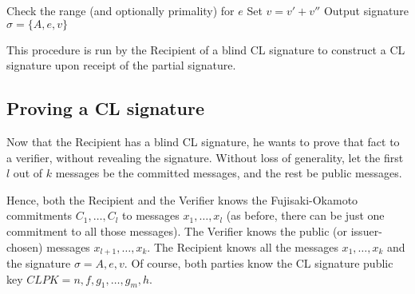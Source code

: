 \begin{algorithm}[H]\label{constructCL}
\dontprintsemicolon

\BlankLine

 \;
\Indp
  Check the range (and optionally primality) for $e$ \;
  Set $v = v' + v''$ \;
  Output signature $\sigma = \{A,e,v\}$ \;
\Indm

\caption{This procedure is run by the Recipient of a blind CL signature to construct a CL signature upon receipt of the partial signature.}
\end{algorithm}





\subsection{Proving a CL signature}

Now that the Recipient has a blind CL signature, he wants to prove that fact to a verifier, without revealing the signature. Without loss of generality, let the first $l$ out of $k$ messages be the committed messages, and the rest be public messages.

Hence, both the Recipient and the Verifier knows the Fujisaki-Okamoto commitments $C_1,\ldots,C_l$ to messages $x_1,\ldots,x_l$ (as before, there can be just one commitment to all those messages). The Verifier knows the public (or issuer-chosen) messages $x_{l+1},\ldots,x_k$. The Recipient knows all the messages $x_1,\ldots,x_k$ and the signature $\sigma = A,e,v$. Of course, both parties know the CL signature public key $CLPK = n,f,g_1,\ldots,g_m,h$.

